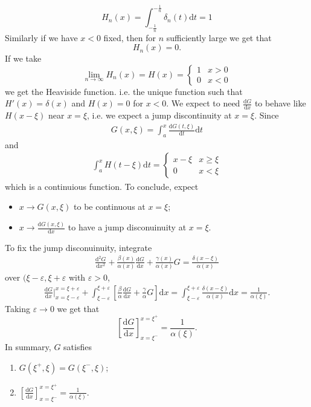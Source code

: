 \documentclass{article}
\begin{document}
\[
	H_n(x)=\int_{-\frac1n}^{-\frac1n}\delta_n(t)\mathrm dt=1
\]
Similarly if we have $ x<0 $ fixed, then for $ n $ sufficiently large we get that
\[ H_n(x)=0. \]
If we take
\[
	\lim_{n\to\infty} H_n(x)=H(x)=\begin{cases}
		1 & x> 0\\
		0 & x< 0
	\end{cases}
\]
we get the Heaviside function. i.e. the unique function such that $ H'(x)=\delta(x) $ and $ H(x)=0 $ for $ x<0 $. We expect to need $ \frac{\mathrm dG}{\mathrm dx} $ to behave like $ H(x-\xi) $ near $ x=\xi $, i.e. we expect a jump discontinuity at $ x=\xi $. Since
\begin{align*}
	G(x,\xi)=\int_a^x\frac{\mathrm dG(t,\xi)}{\mathrm dt}\mathrm dt
\end{align*}
and
\begin{align*}
  \int_a^xH(t-\xi)\mathrm dt=\begin{cases}
	  x-\xi & x\ge \xi \\
	  0 & x < \xi
  \end{cases}
\end{align*}
which is a continuious function. To conclude, expect
\begin{itemize}
	\item $ x\to G(x,\xi) $ to be continuous at $ x=\xi $;
	\item $ x\to \frac{\mathrm dG(x,\xi)}{\mathrm dx} $ to have a jump disconuinuity at $ x=\xi $.
\end{itemize}
To fix the jump disconuinuity, integrate
\begin{align*}
	\frac{\mathrm d^2 G}{\mathrm dx^2}+\frac{\beta(x)}{\alpha(x)}\frac{\mathrm dG}{\mathrm dx}+\frac{\gamma(x)}{\alpha(x)}G=\frac{\delta(x-\xi)}{\alpha(x)}
\end{align*}
over $ (\xi-\varepsilon,\xi+\varepsilon $ with $ \varepsilon >0 $,
\begin{align*}
	\frac{\mathrm dG}{\mathrm dx}|_{x=\xi-\varepsilon}^{x=\xi+\varepsilon}+\int_{\xi-\varepsilon}^{\xi+\varepsilon}\left[\frac \beta\alpha\frac{\mathrm dG}{\mathrm dx}+\frac{\gamma}{\alpha}G\right]\mathrm dx=\int_{\xi-\varepsilon}^{\xi+\varepsilon}\frac{\delta(x-\xi)}{\alpha(x)}\mathrm dx=\frac1{\alpha(\xi)}.
\end{align*}
Taking $ \varepsilon\to 0 $ we get that
\[
	\left[\frac{\mathrm dG}{\mathrm dx}\right]_{x=\xi^-}^{x=\xi^+}=\frac1{\alpha(\xi)}.
\]
In summary, $ G $ satisfies
\begin{enumerate}
	\item $ G(\xi^+,\xi)=G(\xi^-,\xi) $;
	\item $ \left[ \frac{\mathrm dG}{\mathrm dx}\right]_{x=\xi^-}^{x=\xi^+}=\frac1{\alpha(\xi)}$.
\end{enumerate}
\end{document}
